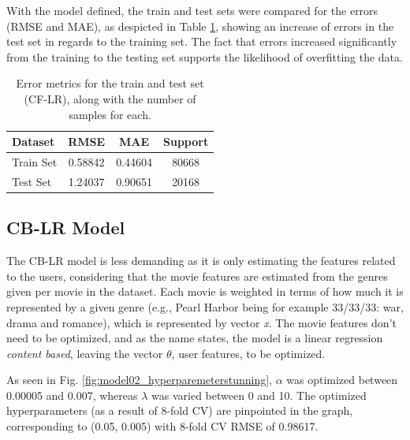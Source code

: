 \documentclass[conference]{IEEEtran}
\begin{document}
With the model defined, the train and test sets were compared for the errors (RMSE and MAE), as despicted in Table \ref{tab:model01_results}, showing an increase of errors in the test set in regards to the training set. The fact that errors increased significantly from the training to the testing set supports the likelihood of overfitting the data.

\begin{table}[H]
\centering
\caption{Error metrics for the train and test set (CF-LR), along with the number of samples for each.}
\label{tab:model01_results}
\begin{tabular}{lccc}
\toprule
\textbf{Dataset} & \textbf{RMSE} & \textbf{MAE} & \textbf{Support} \\
\midrule
Train Set & 0.58842 & 0.44604 & 80668 \\
Test Set & 1.24037 & 0.90651 & 20168 \\
\bottomrule
\end{tabular}
\end{table}

\subsection{CB-LR Model}

The CB-LR model is less demanding as it is only estimating the features related to the users, considering that the movie features are estimated from the genres given per movie in the dataset. Each movie is weighted in terms of how much it is represented by a given genre (e.g., Pearl Harbor being for example 33/33/33: war, drama and romance), which is represented by vector \textit{x}. The movie features don't need to be optimized, and as the name states, the model is a linear regression \textit{content based}, leaving the vector \textit{$\theta$}, user features, to be optimized. 

As seen in Fig. \ref{fig:model02_hyperparemeterstunning}, $\alpha$ was optimized between 0.00005 and 0.007, whereas $\lambda$ was varied between 0 and 10. The optimized hyperparameters (as a result of 8-fold CV) are pinpointed in the graph, corresponding to (0.05, 0.005) with 8-fold CV RMSE of 0.98617.
\end{document}
